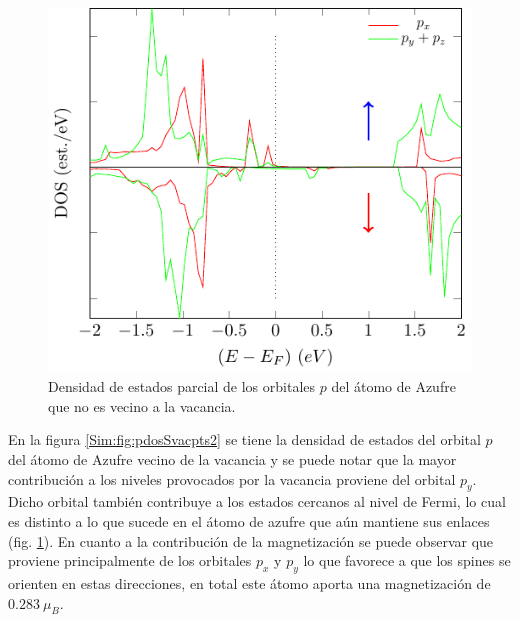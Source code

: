 \begin{figure}[!hbt]
	\centering
	\includegraphics[scale=1]{figRes/PtS2/def/bandas/nosoc/pdosS_ps.pdf}
	\caption[Densidad de estados proyectada en los orbitales $p$ del \'atomo de Azufre en el PtS\textsubscript{2} con una vacancia de Platino.]{Densidad de estados parcial de los orbitales $p$ del \'atomo de Azufre que no es vecino a la vacancia.}
	\label{Sim:fig:pdosSnovacpts2}
\end{figure}
En la figura \ref{Sim:fig:pdosSvacpts2} se tiene la densidad de estados del orbital $p$ del \'atomo de Azufre vecino de la vacancia y se puede notar que la mayor contribuci\'on  a los niveles provocados por la vacancia proviene del orbital $p_y$. Dicho orbital tambi\'en contribuye a los estados cercanos al nivel de Fermi, lo cual es distinto a lo que sucede en el \'atomo de azufre que a\'un mantiene sus enlaces (fig. \ref{Sim:fig:pdosSnovacpts2}). En cuanto a la contribuci\'on de la magnetizaci\'on se puede observar que proviene principalmente de  los orbitales $p_x$ y $p_y$ lo que favorece a que los spines se orienten en estas direcciones, en total este \'atomo aporta una magnetizaci\'on de $0.283~ \mu_B$.
